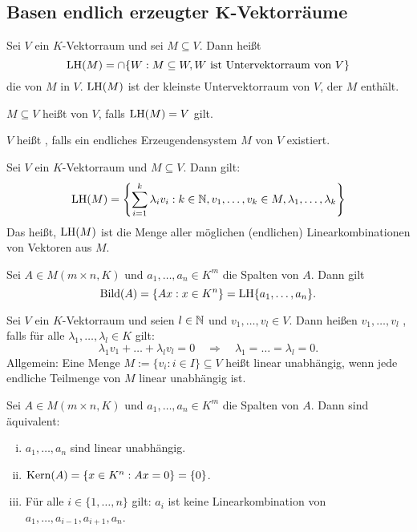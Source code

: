 \subsection{Basen endlich erzeugter $\mathbf{K}$-Vektorräume}

\begin{definition}
	\label{def:I.8.1}
	Sei $V$ ein $K$-Vektorraum und sei $M \subseteq V$.
	Dann heißt
	\[
		\operatorname{LH}(M) = \cap\{W : M \subseteq W, W \text{ ist Untervektorraum von } V\}
	\]
	die  von $M$ in $V$.
	$\operatorname{LH}(M)$ ist der kleinste Untervektorraum von $V$, der $M$ enthält.
	
	$M \subseteq V$ heißt  von $V$, falls $\operatorname{LH}(M) = V$ gilt.
	
	$V$ heißt , falls ein endliches Erzeugendensystem $M$ von $V$ existiert.
\end{definition}

\setcounter{satz}{2}
\begin{lemma}
	\label{lemma:I.8.3}
	Sei $V$ ein $K$-Vektorraum und $M \subseteq V$.
	Dann gilt:
	\[
		\operatorname{LH}(M) = \left\{\sum_{i=1}^{k} \lambda_i v_i : k \in \mathbb{N}, v_1,\dots, v_k \in M, \lambda_1,\dots,\lambda_k\right\}
	\]
	Das heißt, $\operatorname{LH}(M)$ ist die Menge aller möglichen (endlichen) Linearkombinationen von Vektoren aus $M$.
\end{lemma}

\begin{beispiel}
	\label{bsp:I.8.4}
	Sei $A \in M(m \times n, K)$ und $a_1, \dots, a_n \in K^m$ die Spalten von $A$.
	Dann gilt
	\[
		\operatorname{Bild}(A) = \{Ax : x \in K^n\} = \operatorname{LH}\{a_1,\dots,a_n\}.
	\]
\end{beispiel}

\begin{definition}
	\label{def:I.8.5}
	Sei $V$ ein $K$-Vektorraum und seien $l \in \mathbb{N}$ und $v_1,\dots, v_l \in V$.
	Dann heißen $v_1,\dots,v_l$ , falls für alle $\lambda_1, \dots, \lambda_l \in K$ gilt:
	\[
		\lambda_1 v_1 + \dots + \lambda_l v_l = 0 \quad \Rightarrow \quad \lambda_1 = \dots = \lambda_l = 0.
	\]
	Allgemein: Eine Menge $M := \{v_i : i \in I\} \subseteq V$ heißt linear unabhängig, wenn jede endliche Teilmenge von $M$ linear unabhängig ist.
\end{definition}

\setcounter{satz}{8}
\begin{satz}
	\label{satz:I.8.9}
	Sei $A \in M(m\times n, K)$ und $a_1, \dots, a_n \in K^m$ die Spalten von $A$.
	Dann sind äquivalent:
	\begin{enumerate}[(i)]
		\item $a_1,\dots,a_n$ sind linear unabhängig.
		\item $\operatorname{Kern}(A) = \{x \in K^n : Ax = 0\} = \{0\}$.
		\item Für alle $i \in \{1,\dots,n\}$ gilt:
		$a_i$ ist keine Linearkombination von $a_1,\dots,a_{i-1},a_{i+1},a_n$.
	\end{enumerate}
\end{satz}

